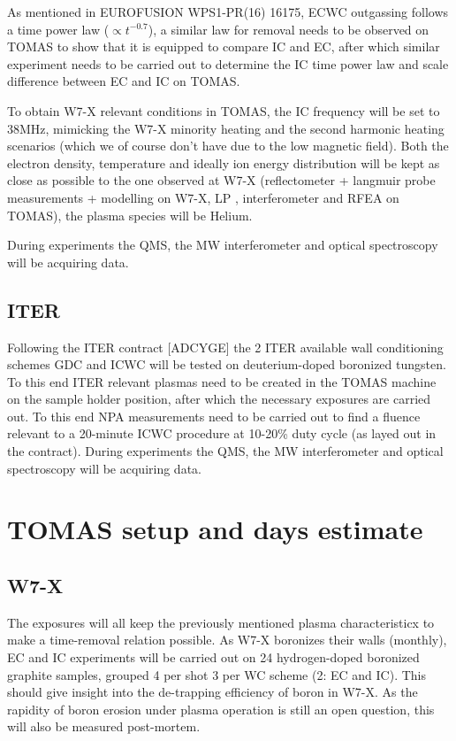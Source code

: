 \documentclass{article}
\begin{document}
As mentioned in EUROFUSION WPS1-PR(16) 16175, ECWC outgassing follows a time
power law ($\propto t^{-0.7}$), a similar law for removal needs to be observed
on TOMAS to show that it is equipped to compare IC and EC, after which similar
experiment needs to be carried out to determine the IC time power law and scale
difference between EC and IC on TOMAS.

To obtain W7-X relevant conditions in TOMAS, the IC frequency will be set to
38MHz, mimicking the W7-X minority heating and the second harmonic heating
scenarios (which we of course don't have due to the low magnetic field).  Both
the electron density, temperature and ideally ion energy distribution 
will be kept as close as possible to the one observed at W7-X 
(reflectometer + langmuir probe measurements + modelling on W7-X, LP
, interferometer and RFEA on TOMAS), the plasma species will be Helium. 

During experiments the QMS, the MW interferometer and optical spectroscopy will
be acquiring data.
\subsection*{ITER}
Following the ITER contract [ADCYGE] the 2 ITER available wall
conditioning schemes GDC and ICWC will be tested on deuterium-doped 
boronized tungsten. To this end ITER relevant plasmas need to be created
in the TOMAS machine on the sample holder position, after which the necessary 
exposures are carried out.
To this end NPA measurements need to be carried out to find a fluence relevant to a 
20-minute ICWC procedure at 10-20\% duty cycle (as layed out in the contract).
During experiments the QMS, the MW interferometer and optical spectroscopy will
be acquiring data.
\section{TOMAS setup and days estimate}
\subsection{W7-X}
The exposures will all keep the previously mentioned plasma characteristicx to make a
time-removal relation possible.  As W7-X boronizes their walls (monthly), EC
and IC experiments will be carried out on 24 hydrogen-doped boronized graphite
samples, grouped 4 per shot 3 per WC scheme (2: EC and IC).  
This should give insight into the de-trapping efficiency of boron in W7-X.
As the rapidity of boron erosion under plasma operation is still an open
question, this will also be measured post-mortem.
\end{document}
